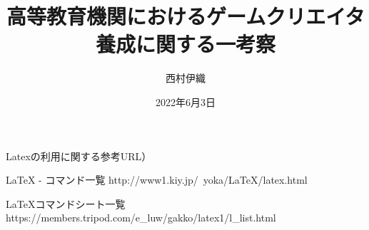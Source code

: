 \documentclass[resume]{hitsotsuron} %
\title{高等教育機関におけるゲームクリエイタ養成に関する一考察}
\author{西村伊織}
\date{2022年6月3日}
\begin{document}

\twocolumn[%
\maketitle
]


Latexの利用に関する参考URL）

LaTeX - コマンド一覧
http://www1.kiy.jp/~yoka/LaTeX/latex.html

LaTeXコマンドシート一覧
https://members.tripod.com/e_luw/gakko/latex1/l_list.html

\fi











\end{document}
